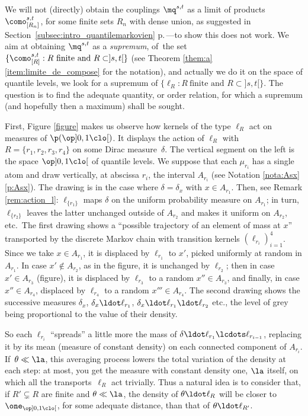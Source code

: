 \begin{rem}\label{rem:qualitative}We will not (directly) obtain the couplings $\mq^{s,t}$ as a limit of products $\como^{s,t}_{[R_n]}$, for some finite sets $R_n$ with dense union, as suggested in Section~\ref{subsec:intro_quantilemarkovien} p.\,\pageref{page:tentative_limite}---to show this does not work. We aim at obtaining $\mq^{s,t}$ as a \emph{supremum}, of~the set $\{\como^{s,t}_{[R]} : R\ \text{finite and } R\subset]s,t[\}$ (see Theorem \ref{them:a}\eqref{item:limite_de_compose} for the notation), and actually we do it on the space of quantile levels, \ie we look for a supremum of $\{\ell_R : R\ \text{finite and } R\subset]s,t[\}$. The question is to find the adequate quantity, or order relation, for which a supremum (and hopefully then a maximum) shall be sought.

First, Figure \ref{figure} makes us observe how kernels of the type $\ell_R$ act on measures of $\p(\op]0,1\clo[)$. It displays the action of $\ell_{R}$ with $R=\{r_1,r_2,r_3,r_4\}$ on some Dirac measure~$\delta$. The vertical segment on the left is the space $\op]0,1\clo[$ of quantile levels. We suppose that each $\mu_{r_i}$ has a single atom and draw vertically, at abscissa $r_i$, the interval $A_{r_i}$ (see Notation \ref{nota:Asx}\eqref{p:Asx}). The drawing is in the case where $\delta=\delta_{x}$ with $x\in A_{r_1}$. Then, see Remark \ref{rem:action_l}: $\ell_{\{r_1\}}$ maps $\delta$ on the uniform probability measure on $A_{r_1}$; in turn, $\ell_{\{r_2\}}$ leaves the latter unchanged outside of $A_{r_2}$ and makes it uniform on $A_{r_2}$, etc.\ The first drawing shows a ``possible trajectory of an element of mass at $x$'' transported by the discrete Markov chain with transition kernels $(\ell_{r_i})_{i=1}^4$. Since we take $x \in A_{r_1}$, it is displaced by $\ell_{r_1}$ to $x '$, picked uniformly at random in $A_{r_1}$. In case $x '\not\in A_{r_2}$, as in the figure, it is unchanged by $\ell_{r_2}$; then in case $x '\in A_{r_3}$ (figure), it is displaced by $\ell_{r_3}$ to a random $x ''\in A_{r_3}$, and finally, in case $x ''\in A_{r_4}$, displaced by $\ell_{r_4}$ to a random $x '''\in A_{r_4}$. The second drawing shows the successive measures $\delta_x $, $\delta_x \ldot\ell_{r_1}$, $\delta_x \ldot\ell_{r_1}{}\ldot\ell_{r_2}$ etc., the level of grey being proportional to the value of their density.

So each $\ell_{r_i}$ ``spreads'' a little more the mass of $\delta\ldot\ell_{r_1}\lcdots \ell_{r_{i-1}}$, replacing it by its mean (measure of constant density) on each connected component of $A_{r_i}$. If~$\theta\ll\la$, this averaging process lowers the total variation of the density at each step: at most, you get the measure with constant density one, \ie $\la$ itself, on which all the transports~$\ell_{R}$ act trivially. Thus a natural idea is to consider that, if ${R'}\subsetneq R$ are finite and $\theta\ll\la$, the density of $\theta\ldot \ell_{R}$ will be closer to $\one_{\op]0,1\clo[}$, for some adequate distance, than that of $\theta\ldot \ell_{R'}$.


\end{rem}
